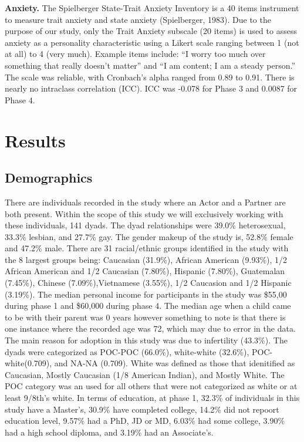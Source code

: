 \documentclass[man]{apa6}
\begin{document}
\textbf{Anxiety.}
The Spielberger State-Trait Anxiety Inventory is a 40 items instrument to measure trait anxiety and state anxiety (Spielberger, 1983). Due to the purpose of our study, only the Trait Anxiety subscale (20 items) is used to assess anxiety as a personality characteristic using a Likert scale ranging between 1 (not at all) to 4 (very much). Example items include: \enquote{I worry too much over something that really doesn't matter} and \enquote{I am content; I am a steady person.} The scale was reliable, with Cronbach's alpha ranged from 0.89 to 0.91. There is nearly no intraclass correlation (ICC). ICC was -0.078 for Phase 3 and 0.0087 for Phase 4.

\hypertarget{results}{%
\section{Results}\label{results}}

\hypertarget{demographics}{%
\subsection{Demographics}\label{demographics}}

There are individuals recorded in the study where an Actor and a Partner are both present. Within the scope of this study we will exclusively working with these individuals, 141 dyads.
The dyad relationships were 39.0\% heterosexual, 33.3\% lesbian, and 27.7\% gay.
The gender makeup of the study is, 52.8\% female and 47.2\% male.
There are 31 racial/ethnic groups identified in the study with the 8 largest groups being: Caucasian (31.9\%), African American (9.93\%), 1/2 African American and 1/2 Caucasian (7.80\%), Hispanic (7.80\%), Guatemalan (7.45\%), Chinese (7.09\%),Vietnamese (3.55\%), 1/2 Caucasion and 1/2 Hispanic (3.19\%).
The median personal income for participants in the study was \$55,00 during phase 1 and \$60,000 during phase 4.
The median age when a child came to be with their parent was 0 years however something to note is that there is one instance where the recorded age was 72, which may due to error in the data.
The main reason for adoption in this study was due to infertility (43.3\%).
The dyads were categorized as POC-POC (66.0\%), white-white (32.6\%), POC-white(0.709), and NA-NA (0.709). White was defined as those that idenitified as Caucasian, Mostly Caucasian (1/8 American Indian), and Mostly White. The POC category was an used for all others that were not categorized as white or at least 9/8th's white.
In terms of education, at phase 1, 32.3\% of individuals in this study have a Master's, 30.9\% have completed college, 14.2\% did not repoort education level, 9.57\% had a PhD, JD or MD, 6.03\% had some college, 3.90\% had a high school diploma, and 3.19\% had an Associate's.
\end{document}

